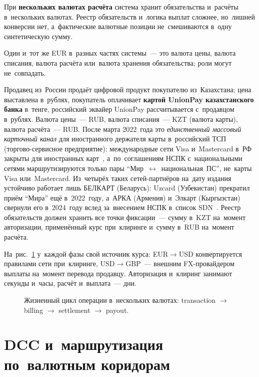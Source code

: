 При \textbf{нескольких валютах расчёта} система хранит обязательства и~расчёты
в~нескольких валютах. Реестр обязательств и~логика выплат сложнее, но~лишней
конверсии нет, а~фактические валютные позиции не~смешиваются в~одну
синтетическую сумму.

Один и~тот же EUR в~разных частях системы~--- это валюта цены, валюта списания,
валюта расчёта или~валюта хранения обязательства; роли могут не~совпадать.

Продавец из~России продаёт цифровой продукт покупателю из~Казахстана; цена
выставлена в~рублях, покупатель оплачивает \textbf{картой UnionPay
казахстанского банка} в~тенге, российский эквайер UnionPay рассчитывается
с~продавцом в~рублях. Валюта цены~--- RUB, валюта списания~---
KZT (валюта карты), валюта расчёта~--- RUB. После марта 2022~года это
\textit{единственный массовый карточный канал} для иностранного держателя карты
в~российский ТСП (торгово-сервисное предприятие): международные сети Visa
и~Mastercard в~РФ закрыты для иностранных карт~\cite{cbr-ps,nspk-mir-rules},
а~по~соглашениям НСПК с~национальными сетями маршрутизируются только пары
\enquote{Мир~$\leftrightarrow$~национальная~ПС}, не~карты Visa или~Mastercard. Из~четырёх
таких сетей-партнёров на~дату издания устойчиво работает лишь БЕЛКАРТ (Беларусь):
Uzcard (Узбекистан) прекратил приём \enquote{Мира} ещё в~2022~году, а~АРКА
(Армения) и~Элкарт (Кыргызстан) свернули его в~2024~году вслед за~внесением НСПК
в~список SDN~\cite{ofac-russia-sanctions}.
Реестр обязательств должен хранить все точки фиксации~--- сумму в~KZT на~момент
авторизации, применённый курс при~клиринге и~сумму в~RUB на~момент расчёта.

На~рис.~\ref{fig:three-currencies-timeline} у~каждой фазы свой источник курса:
\mbox{EUR$\to$USD} конвертируется правилами
сети при~клиринге, \mbox{USD$\to$GBP}~--- внешним FX-провайдером выплаты
на~момент перевода продавцу. Авторизация и~клиринг занимают секунды и~часы,
расчёт и~выплата~--- дни.

\begin{figure}[htb]
  \centering
  \caption{Жизненный цикл операции в~нескольких валютах: transaction
  $\to$ billing $\to$ settlement $\to$ payout.}\label{fig:three-currencies-timeline}
\end{figure}

\section{DCC и~маршрутизация по~валютным коридорам}\label{sec:mc-dcc}

